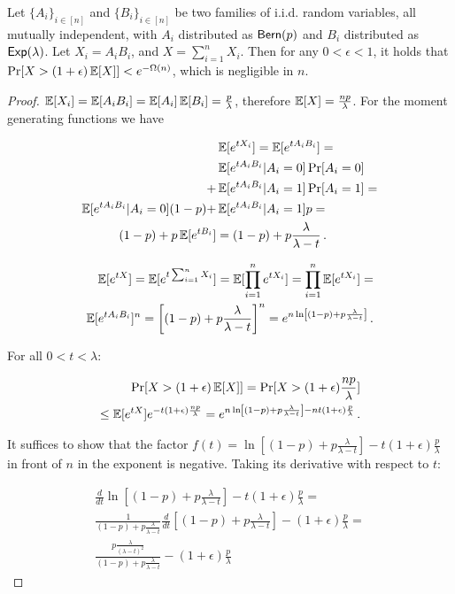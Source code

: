 \begin{theorem}
  Let $\{ A_i \}_{i \in [n]}$ and $\{ B_i \}_{i \in [n]}$ be two families of i.i.d. random variables,
  all mutually independent,
  with $A_i$ distributed as $\textsf{Bern}(p)$ and $B_i$ distributed as $\textsf{Exp}(\lambda)$.
  Let $X_i = A_i B_i$, and $X = \sum_{i = 1}^n X_i$.
  Then for any $0 < \epsilon < 1$, it holds that
  $\Pr[X > (1 + \epsilon) \mathop{{}\mathbb{E}}[X]] < e^{-\Omega(n)}$,
  which is negligible in $n$.
\end{theorem}
\begin{proof}
  $\mathop{{}\mathbb{E}}[X_i] = \mathop{{}\mathbb{E}}[A_i B_i] = \mathop{{}\mathbb{E}}[A_i] \mathop{{}\mathbb{E}}[B_i] = \frac{p}{\lambda}$, therefore
  $\mathop{{}\mathbb{E}}[X] = \frac{np}{\lambda}$. For the moment generating functions we have

  \begin{align*}
    &\mathop{{}\mathbb{E}}[e^{t X_i}] = \mathop{{}\mathbb{E}}[e^{t A_i B_i}] =\\
      &\mathop{{}\mathbb{E}}[e^{t A_i B_i}|A_i = 0] \Pr[A_i = 0]\\
    + &\mathop{{}\mathbb{E}}[e^{t A_i B_i}|A_i = 1] \Pr[A_i = 1] = \\
    \mathop{{}\mathbb{E}}[e^{t A_i B_i}|A_i = 0] (1 - p) + &\mathop{{}\mathbb{E}}[e^{t A_i B_i}|A_i = 1] p = \\
    (1 - p) + p \mathop{{}\mathbb{E}}[e^{t B_i}] &= (1 - p) + p \frac{\lambda}{\lambda - t}\,.
  \end{align*}

  \begin{align*}
    \mathop{{}\mathbb{E}}[e^{tX}] = \mathop{{}\mathbb{E}}[e^{t \sum_{i = 1}^n X_i}] = \mathop{{}\mathbb{E}}[\prod_{i = 1}^n e^{t X_i}] = \prod_{i = 1}^n \mathop{{}\mathbb{E}}[e^{t X_i}] = \\
    \mathop{{}\mathbb{E}}[e^{t A_i B_i}]^n = \left[(1 - p) + p\frac{\lambda}{\lambda - t}\right]^n = e^{n \ln\left[(1 - p) + p\frac{\lambda}{\lambda - t}\right]}\,.
  \end{align*}

  For all $0 < t < \lambda$:

  \begin{align*}
    \Pr[X > (1 + \epsilon)\mathop{{}\mathbb{E}}[X]] = \Pr[X > (1 + \epsilon)\frac{np}{\lambda}]\\
    \leq \mathop{{}\mathbb{E}}[e^{tX}] e^{-t(1 + \epsilon)\frac{np}{\lambda}}
    = e^{n \ln\left[(1 - p) + p\frac{\lambda}{\lambda - t}\right] - n t(1 + \epsilon)\frac{p}{\lambda}}\,.
  \end{align*}

  It suffices to show that the factor
  $f(t) = \ln\left[(1 - p) + p\frac{\lambda}{\lambda - t}\right] - t(1 + \epsilon)\frac{p}{\lambda}$
  in front of $n$ in the exponent is negative. Taking its derivative with respect to $t$:

  \begin{align*}
    \frac{d}{dt} \ln\left[(1 - p) + p\frac{\lambda}{\lambda - t}\right] - t(1 + \epsilon)\frac{p}{\lambda} = \\
    \frac{1}{(1 - p) + p\frac{\lambda}{\lambda - t}} \frac{d}{dt} \left[(1 - p) + p\frac{\lambda}{\lambda - t}\right] - (1 + \epsilon)\frac{p}{\lambda} = \\
    \frac{p\frac{\lambda}{(\lambda - t)^2}}{(1 - p) + p\frac{\lambda}{\lambda - t}} - (1 + \epsilon)\frac{p}{\lambda}
  \end{align*}


\end{proof}
